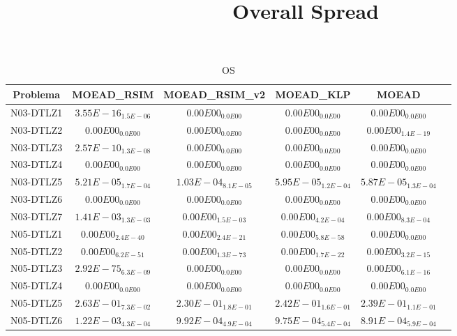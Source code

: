 \documentclass{article}
\title{Overall Spread}
\author{}
\begin{document}
\maketitle
\begin{table*}[ht!]
\scriptsize
\caption{OS}
\centering\begin{tabular}{|c||c||c||c||c||c|} \hline
Problema &MOEAD_RSIM &MOEAD_RSIM_v2 &MOEAD_KLP &MOEAD\\\hline
N03-DTLZ1 &\cellcolor{gray95}$3.55E-16_{1.5E-06}$ &\cellcolor{gray25}$0.00E00_{0.0E00}$ &$0.00E00_{0.0E00}$ &$0.00E00_{0.0E00}$\\ 
\hline
N03-DTLZ2 &\cellcolor{gray95}$0.00E00_{0.0E00}$ &\cellcolor{gray25}$0.00E00_{0.0E00}$ &$0.00E00_{0.0E00}$ &$0.00E00_{1.4E-19}$\\ 
\hline
N03-DTLZ3 &\cellcolor{gray95}$2.57E-10_{1.3E-08}$ &\cellcolor{gray25}$0.00E00_{0.0E00}$ &$0.00E00_{0.0E00}$ &$0.00E00_{0.0E00}$\\ 
\hline
N03-DTLZ4 &\cellcolor{gray95}$0.00E00_{0.0E00}$ &\cellcolor{gray25}$0.00E00_{0.0E00}$ &$0.00E00_{0.0E00}$ &$0.00E00_{0.0E00}$\\ 
\hline
N03-DTLZ5 &$5.21E-05_{1.7E-04}$ &\cellcolor{gray95}$1.03E-04_{8.1E-05}$ &\cellcolor{gray25}$5.95E-05_{1.2E-04}$ &$5.87E-05_{1.3E-04}$\\ 
\hline
N03-DTLZ6 &\cellcolor{gray95}$0.00E00_{0.0E00}$ &\cellcolor{gray25}$0.00E00_{0.0E00}$ &$0.00E00_{0.0E00}$ &$0.00E00_{0.0E00}$\\ 
\hline
N03-DTLZ7 &\cellcolor{gray95}$1.41E-03_{1.3E-03}$ &$0.00E00_{1.5E-03}$ &\cellcolor{gray25}$0.00E00_{4.2E-04}$ &$0.00E00_{8.3E-04}$\\ 
\hline
N05-DTLZ1 &$0.00E00_{2.4E-40}$ &$0.00E00_{2.4E-21}$ &\cellcolor{gray25}$0.00E00_{5.8E-58}$ &\cellcolor{gray95}$0.00E00_{0.0E00}$\\ 
\hline
N05-DTLZ2 &\cellcolor{gray25}$0.00E00_{6.2E-51}$ &\cellcolor{gray95}$0.00E00_{1.3E-73}$ &$0.00E00_{1.7E-22}$ &$0.00E00_{3.2E-15}$\\ 
\hline
N05-DTLZ3 &\cellcolor{gray95}$2.92E-75_{6.3E-09}$ &\cellcolor{gray25}$0.00E00_{0.0E00}$ &$0.00E00_{0.0E00}$ &$0.00E00_{6.1E-16}$\\ 
\hline
N05-DTLZ4 &\cellcolor{gray95}$0.00E00_{0.0E00}$ &\cellcolor{gray25}$0.00E00_{0.0E00}$ &$0.00E00_{0.0E00}$ &$0.00E00_{0.0E00}$\\ 
\hline
N05-DTLZ5 &\cellcolor{gray95}$2.63E-01_{7.3E-02}$ &$2.30E-01_{1.8E-01}$ &\cellcolor{gray25}$2.42E-01_{1.6E-01}$ &$2.39E-01_{1.1E-01}$\\ 
\hline
N05-DTLZ6 &\cellcolor{gray95}$1.22E-03_{4.3E-04}$ &\cellcolor{gray25}$9.92E-04_{4.9E-04}$ &$9.75E-04_{5.4E-04}$ &$8.91E-04_{5.9E-04}$\\ 

\end{tabular}
\end{table*}
\end{document}
